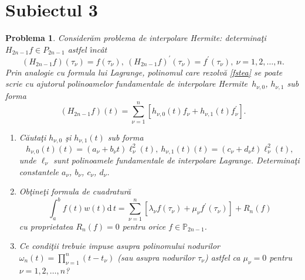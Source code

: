\documentclass{article}%
\newtheorem{problem}[theorem]{Problema}
\begin{document}
\section*{Subiectul 3}

\begin{problem}
\label{Gautschip3.34}Consider\u{a}m problema de interpolare Hermite:
determina\c{t}i $H_{2n-1}f\in P_{2n-1}$ astfel \^{\i}nc\^{a}t
\begin{equation}
\left(  H_{2n-1}f\right)  \left(  \tau_{\nu}\right)  =f\left(  \tau_{\nu
}\right)  ,~\left(  H_{2n-1}f\right)  ^{\prime}\left(  \tau_{\nu}\right)
=f^{\prime}\left(  \tau_{\nu}\right)  ,~\nu=1,2,\dots,n. \tag{(*)}%
\label{fstea}%
\end{equation}
Prin analogie cu formula lui Lagrange, polinomul care rezolv\u{a} \ref{fstea}
se poate scrie cu ajutorul polinoamelor fundamentale de interpolare
Hermite\ $h_{\nu,0}$, $h_{\nu,1}$ sub forma%
\[
\left(  H_{2n-1}f\right)  (t)=\sum_{\nu=1}^{n}\left[  h_{\nu,0}(t)f_{\nu
}+h_{\nu,1}\left(  t\right)  f_{\nu}^{\prime}\right]  .
\]


\begin{enumerate}
\item[(a)] C\u{a}uta\c{t}i $h_{\nu,0}$ \c{s}i $h_{\nu,1}\left(  t\right)  $
sub forma
\[
h_{\nu,0}\left(  t\right)  (t)=\left(  a_{\nu}+b_{\nu}t\right)  \ell_{\nu}%
^{2}(t),~h_{\nu,1}\left(  t\right)  \left(  t\right)  =\left(  c_{\nu}+d_{\nu
}t\right)  \ell_{\nu}^{2}(t),
\]
unde $\ell_{\nu}$ sunt polinoamele fundamentale de interpolare Lagrange.
Determina\c{t}i constantele $a_{\nu}$, $b_{\nu}$, $c_{\nu}$, $d_{\nu}$.

\item[(b)] Ob\c{t}ine\c{t}i formula de cuadratur\u{a}
\[
\int_{a}^{b}f(t)w(t)\mathrm{d}\,t=\sum_{\nu=1}^{n}\left[  \lambda_{\nu
}f\left(  \tau_{\nu}\right)  +\mu_{\nu}f^{\prime}\left(  \tau_{\nu}\right)
\right]  +R_{n}(f)
\]
cu proprietatea $R_{n}\left(  f\right)  =0$ pentru orice $f\in\mathbb{P}%
_{2n-1}$.

\item[(c)] Ce condi\c{t}ii trebuie impuse asupra polinomului nodurilor
$\omega_{n}(t)=\prod\limits_{\nu=1}^{n}\left(  t-t_{\nu}\right)  $ (sau asupra
nodurilor $\tau_{\nu}$) astfel ca $\mu_{\nu}=0$ pentru $\nu=1,2,\dots,n$?
\end{enumerate}
\end{problem}
\end{document}
